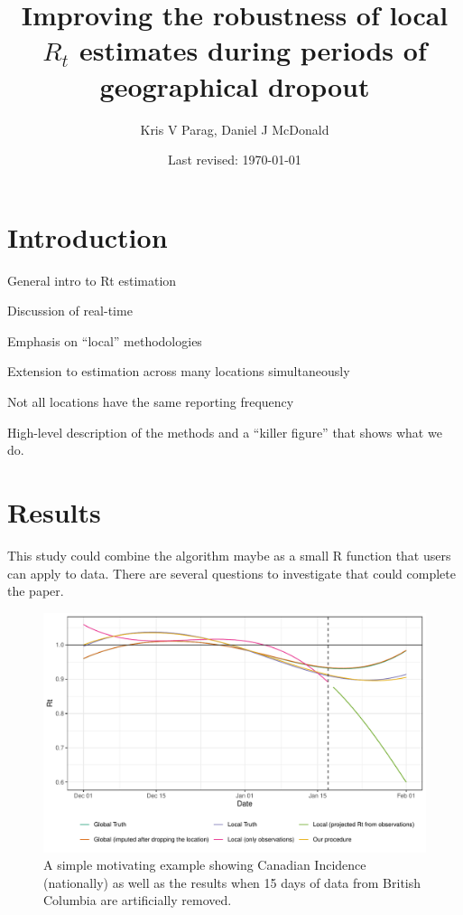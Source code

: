 \documentclass[12pt]{article}
\title{\huge Improving the robustness of local $R_t$ estimates during periods of geographical dropout}
\author{Kris V Parag, Daniel J McDonald}
\date{Last revised: \today}
\begin{document}
\maketitle

\section*{Introduction}

\bitem
\item General intro to Rt estimation
\item Discussion of real-time
\item Emphasis on ``local'' methodologies
\item Extension to estimation across many locations simultaneously 
\item Not all locations have the same reporting frequency
\item High-level description of the methods and a ``killer figure'' that shows
what we do.
\eitem


\section*{Results}

This study could combine the algorithm maybe as a small R function that users
can apply to data. There are several questions to investigate that
could complete the paper. 

\begin{figure}
  \centering
\includegraphics[width=.9\textwidth]{first-fig.pdf}
\caption{A simple motivating example showing Canadian Incidence (nationally) as
well as the results when 15 days of data from British Columbia are artificially
removed.}
\label{fig:prelim1}
\end{figure}
\end{document}
